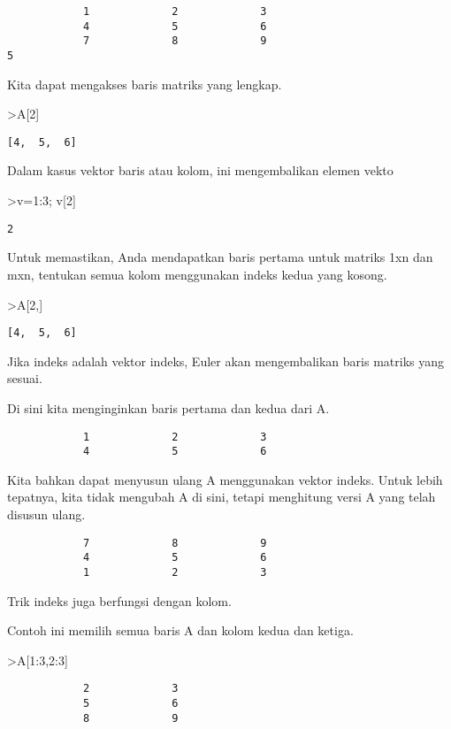 \documentclass[
]{book}
\begin{document}
\begin{verbatim}
            1             2             3 
            4             5             6 
            7             8             9 
5
\end{verbatim}

Kita dapat mengakses baris matriks yang lengkap.

\textgreater A{[}2{]}

\begin{verbatim}
[4,  5,  6]
\end{verbatim}

Dalam kasus vektor baris atau kolom, ini mengembalikan elemen vekto

\textgreater v=1:3; v{[}2{]}

\begin{verbatim}
2
\end{verbatim}

Untuk memastikan, Anda mendapatkan baris pertama untuk matriks 1xn dan mxn, tentukan semua kolom menggunakan indeks kedua yang kosong.

\textgreater A{[}2,{]}

\begin{verbatim}
[4,  5,  6]
\end{verbatim}

Jika indeks adalah vektor indeks, Euler akan mengembalikan baris matriks yang sesuai.

Di sini kita menginginkan baris pertama dan kedua dari A.

\begin{verbatim}
            1             2             3 
            4             5             6 
\end{verbatim}

Kita bahkan dapat menyusun ulang A menggunakan vektor indeks. Untuk lebih tepatnya, kita tidak mengubah A di sini, tetapi menghitung versi A yang telah disusun ulang.

\begin{verbatim}
            7             8             9 
            4             5             6 
            1             2             3 
\end{verbatim}

Trik indeks juga berfungsi dengan kolom.

Contoh ini memilih semua baris A dan kolom kedua dan ketiga.

\textgreater A{[}1:3,2:3{]}

\begin{verbatim}
            2             3 
            5             6 
            8             9 
\end{verbatim}
\end{document}
